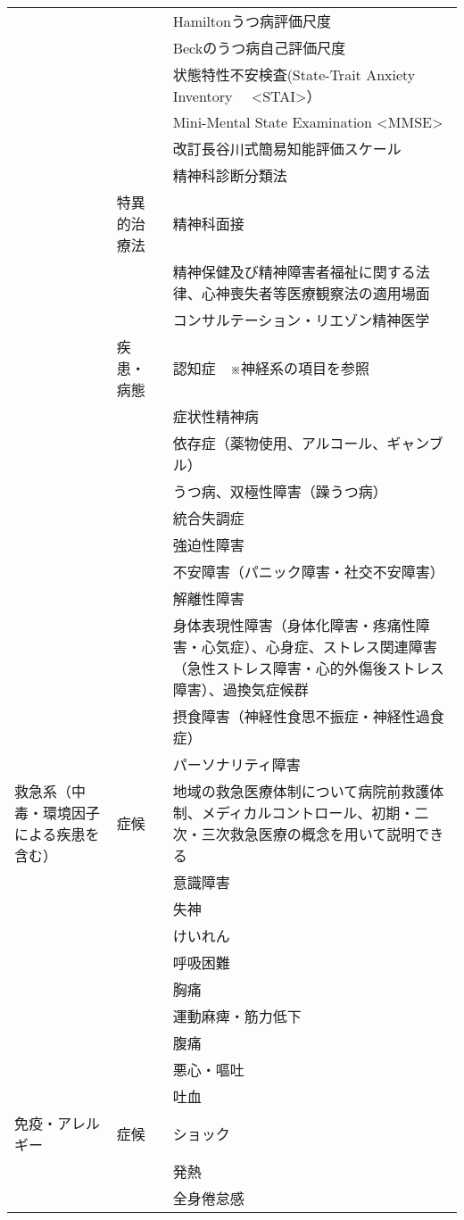 \documentclass[
]{ltjsarticle}
\begin{document}
\begin{xltabular}{\linewidth}{XXX}
 &  & Hamiltonうつ病評価尺度 \\
 &  & Beckのうつ病自己評価尺度 \\
 &  & 状態特性不安検査(State-Trait Anxiety Inventory　 <STAI>） \\
 &  & Mini-Mental State Examination <MMSE> \\
 &  & 改訂長谷川式簡易知能評価スケール \\
 &  & 精神科診断分類法 \\
 & 特異的治療法 & 精神科面接 \\
 &  & 精神保健及び精神障害者福祉に関する法律、心神喪失者等医療観察法の適用場面 \\
 &  & コンサルテーション・リエゾン精神医学 \\
 & 疾患・病態 & 認知症　※神経系の項目を参照 \\
 &  & 症状性精神病 \\
 &  & 依存症（薬物使用、アルコール、ギャンブル） \\
 &  & うつ病、双極性障害（躁うつ病） \\
 &  & 統合失調症 \\
 &  & 強迫性障害 \\
 &  & 不安障害（パニック障害・社交不安障害） \\
 &  & 解離性障害 \\
 &  & 身体表現性障害（身体化障害・疼痛性障害・心気症）、心身症、ストレス関連障害（急性ストレス障害・心的外傷後ストレス障害）、過換気症候群 \\
 &  & 摂食障害（神経性食思不振症・神経性過食症） \\
 &  & パーソナリティ障害 \\
救急系（中毒・環境因子による疾患を含む） & 症候 & 地域の救急医療体制について病院前救護体制、メディカルコントロール、初期・二次・三次救急医療の概念を用いて説明できる \\
 &  & 意識障害 \\
 &  & 失神 \\
 &  & けいれん \\
 &  & 呼吸困難 \\
 &  & 胸痛 \\
 &  & 運動麻痺・筋力低下 \\
 &  & 腹痛 \\
 &  & 悪心・嘔吐 \\
 &  & 吐血 \\
免疫・アレルギー & 症候 & ショック \\
 &  & 発熱 \\
 &  & 全身倦怠感 \\

\end{xltabular}
\end{document}
